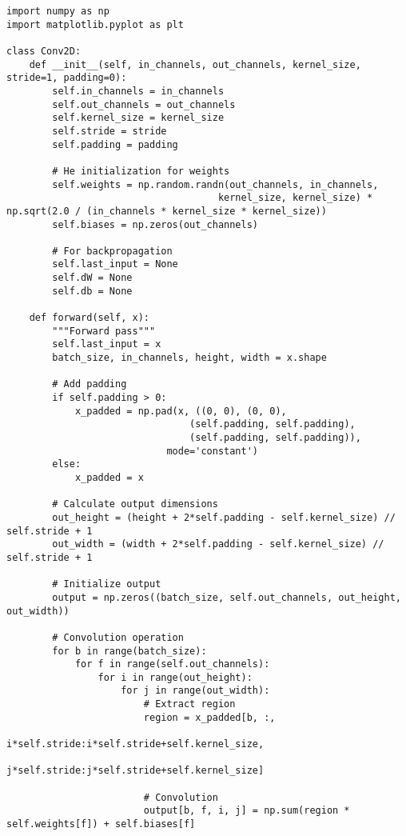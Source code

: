 ﻿\documentclass[12pt,a4paper]{article}
\begin{document}
\begin{lstlisting}
import numpy as np
import matplotlib.pyplot as plt

class Conv2D:
    def __init__(self, in_channels, out_channels, kernel_size, stride=1, padding=0):
        self.in_channels = in_channels
        self.out_channels = out_channels
        self.kernel_size = kernel_size
        self.stride = stride
        self.padding = padding
        
        # He initialization for weights
        self.weights = np.random.randn(out_channels, in_channels, 
                                     kernel_size, kernel_size) * np.sqrt(2.0 / (in_channels * kernel_size * kernel_size))
        self.biases = np.zeros(out_channels)
        
        # For backpropagation
        self.last_input = None
        self.dW = None
        self.db = None
    
    def forward(self, x):
        """Forward pass"""
        self.last_input = x
        batch_size, in_channels, height, width = x.shape
        
        # Add padding
        if self.padding > 0:
            x_padded = np.pad(x, ((0, 0), (0, 0), 
                                (self.padding, self.padding), 
                                (self.padding, self.padding)), 
                            mode='constant')
        else:
            x_padded = x
        
        # Calculate output dimensions
        out_height = (height + 2*self.padding - self.kernel_size) // self.stride + 1
        out_width = (width + 2*self.padding - self.kernel_size) // self.stride + 1
        
        # Initialize output
        output = np.zeros((batch_size, self.out_channels, out_height, out_width))
        
        # Convolution operation
        for b in range(batch_size):
            for f in range(self.out_channels):
                for i in range(out_height):
                    for j in range(out_width):
                        # Extract region
                        region = x_padded[b, :, 
                                        i*self.stride:i*self.stride+self.kernel_size,
                                        j*self.stride:j*self.stride+self.kernel_size]
                        
                        # Convolution
                        output[b, f, i, j] = np.sum(region * self.weights[f]) + self.biases[f]
        

\end{lstlisting}
\end{document}
